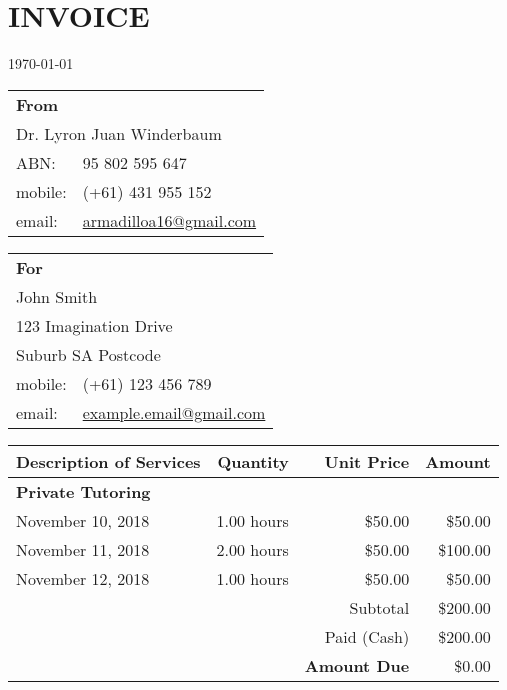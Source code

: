 \documentclass[a4paper,12pt]{report}
\begin{document}
 

\chapter*{INVOICE}

\today

\begin{multicols}{2}
\begin{flushleft}


\begin{tabular}{ll}
\textbf{From} & \\
\multicolumn{2}{l}{Dr. Lyron Juan Winderbaum} \\
ABN: & 95 802 595 647 \\
mobile: & (+61) 431 955 152 \\
email: & \href{mailto:armadilloa16@gmail.com}{armadilloa16@gmail.com} \\
\end{tabular}
\end{flushleft}

\begin{flushright}
\begin{tabular}{ll}
\textbf{For} & \\
\multicolumn{2}{l}{John Smith} \\
\multicolumn{2}{l}{123 Imagination Drive} \\
\multicolumn{2}{l}{Suburb SA Postcode} \\
mobile: & (+61) 123 456 789 \\
email: & \href{mailto:example.email@gmail.com}{example.email@gmail.com} \\
\end{tabular}
\end{flushright}
\end{multicols}                                  

\vspace{2cm}

\renewcommand{\arraystretch}{1.4}
\begin{center}
\begin{tabular}{lrrr}
\hline
\textbf{Description of Services} & \textbf{Quantity} & \textbf{Unit Price} & \textbf{Amount} \\ \hline
\textbf{Private Tutoring} & & & \\
November 10, 2018 & 1.00 hours & \$50.00 & \$50.00 \\ 
November 11, 2018 & 2.00 hours & \$50.00 & \$100.00 \\ 
November 12, 2018 & 1.00 hours & \$50.00 & \$50.00 \\ 
\hline 
& & Subtotal & \$200.00 \\
& & Paid (Cash) & \$200.00 \\
& & \textbf{Amount Due} & \$0.00 \\
\end{tabular}
\end{center}
\end{document}
